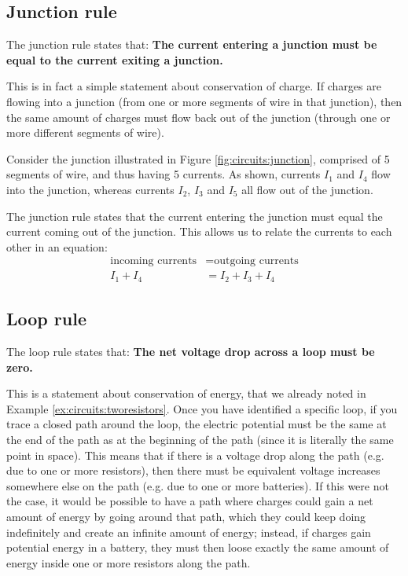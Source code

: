 \subsection{Junction rule}
The junction rule states that: \textbf{The current entering a junction must be equal to the current exiting a junction.}

This is in fact a simple statement about conservation of charge. If charges are flowing into a junction (from one or more segments of wire in that junction), then the same amount of charges must flow back out of the junction (through one or more different segments of wire).

Consider the junction illustrated in Figure \ref{fig:circuits:junction}, comprised of 5 segments of wire, and thus having 5 currents. As shown, currents $I_1$ and $I_4$ flow into the junction, whereas currents $I_2$, $I_3$ and $I_5$ all flow out of the junction. 


The junction rule states that the current entering the junction must equal the current coming out of the junction. This allows us to relate the currents to each other in an equation:
\begin{align*}
\text{incoming currents}&=\text{outgoing currents}\\
I_1+I_4 &=I_2+I_3+I_4
\end{align*}

\subsection{Loop rule}
The loop rule states that: \textbf{The net voltage drop across a loop must be zero.}

This is a statement about conservation of energy, that we already noted in Example \ref{ex:circuits:tworesistors}. Once you have identified a specific loop, if you trace a closed path around the loop, the electric potential must be the same at the end of the path as at the beginning of the path (since it is literally the same point in space). This means that if there is a voltage drop along the path (e.g. due to one or more resistors), then there must be equivalent voltage increases somewhere else on the path (e.g. due to one or more batteries). If this were not the case, it would be possible to have a path where charges could gain a net amount of energy by going around that path, which they could keep doing indefinitely and create an infinite amount of energy; instead, if charges gain potential energy in a battery, they must then loose exactly the same amount of energy inside one or more resistors along the path.

